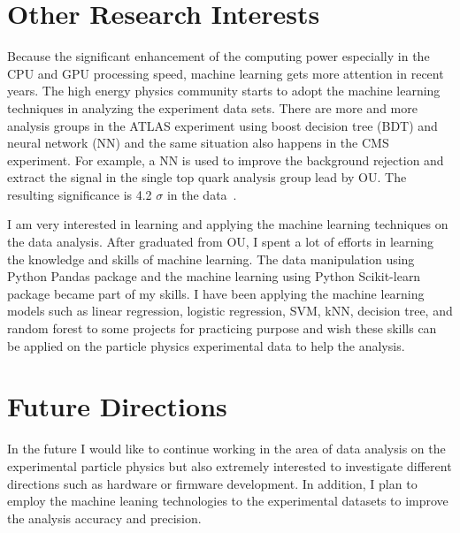 \documentclass[12pt]{article}
\begin{document}

\section{Other Research Interests}
Because the significant enhancement of the computing power especially in the CPU and GPU processing speed, machine learning gets more attention in recent years. 
The high energy physics community starts to adopt the machine learning techniques in analyzing the experiment data sets.
There are more and more analysis groups in the ATLAS experiment using boost decision tree (BDT) and neural network (NN) and the same situation also happens in the CMS experiment.
For example, a NN is used to improve the background rejection and extract the signal in the single top quark analysis group lead by OU. The resulting significance is 4.2 $\sigma$ in the data~\cite{Aaboud:2017ylb}.

I am very interested in learning and applying the machine learning techniques on the  data analysis.
After graduated from OU, I spent a lot of efforts in learning the knowledge and skills of  machine learning.
The data manipulation using Python Pandas package and the machine learning using Python Scikit-learn package became part of my skills.
I have been applying the machine learning models such as linear regression, logistic regression, SVM, kNN, decision tree, and random forest to some projects for practicing purpose and wish these skills can be applied on the particle physics experimental data to help the analysis.


\section{Future Directions}
In the future I would like to continue working in the area of data analysis on the experimental particle physics but also  extremely interested to investigate different directions such as hardware or firmware development.
In addition, I plan to employ the machine leaning technologies to the experimental datasets to improve the analysis accuracy and precision.

\end{document}
